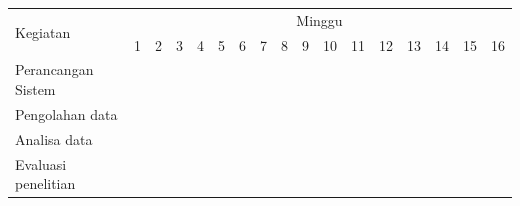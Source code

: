 \newcommand{\w}{}
\newcommand{\G}{\cellcolor{gray}}
\begin{table}[h!]
  \begin{tabular}{|p{3.5cm}|c|c|c|c|c|c|c|c|c|c|c|c|c|c|c|c|}

    \hline
    \multirow{2}{*}{Kegiatan} & \multicolumn{16}{|c|}{Minggu} \\
    \cline{2-17} &
    1 & 2 & 3 & 4 & 5 & 6 & 7 & 8 & 9 & 10 & 11 & 12 & 13 & 14 & 15 & 16 \\
    \hline

    Perancangan Sistem &
    \G & \G & \G & \G & \G & \G & \w & \w & \w & \w & \w & \w & \w & \w & \w & \w \\
    \hline

    Pengolahan data &
    \w & \w & \w & \w & \w & \w & \G & \G & \G & \w & \w & \w & \w & \w & \w & \w \\
    \hline

    Analisa data &
    \w & \w & \w & \w & \w & \w & \w & \w & \w & \G & \G & \G & \w & \w & \w & \w \\
    \hline

    Evaluasi penelitian &
    \w & \w & \w & \w & \w & \w & \w & \w & \w & \w & \w & \w & \G & \G & \G & \G \\
    \hline

  \end{tabular}
  \label{tbl:timeline}
\end{table}

